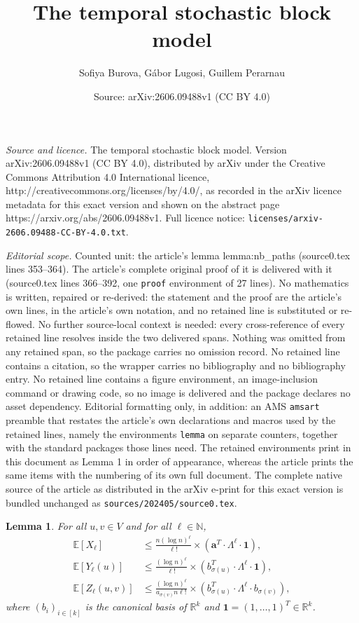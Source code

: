 \documentclass[10pt,a4paper]{amsart}
\title{The temporal stochastic block model}
\author{Sofiya Burova, G\'abor Lugosi, Guillem Perarnau}
\date{Source: arXiv:2606.09488v1 (CC BY 4.0)}
\newtheorem{lemma}{Lemma}
\newcommand\bE{{\mathbb E}}
\newcommand\bN{{\mathbb N}}
\begin{document}
\maketitle

\noindent\emph{Source and licence.} The temporal stochastic block model. Version arXiv:2606.09488v1 (CC BY 4.0), distributed by arXiv under the Creative Commons Attribution 4.0 International licence, http://creativecommons.org/licenses/by/4.0/, as recorded in the arXiv licence metadata for this exact version and shown on the abstract page https://arxiv.org/abs/2606.09488v1. Full licence notice: \texttt{licenses/arxiv-2606.09488-CC-BY-4.0.txt}.\par\smallskip

\noindent\textit{Editorial scope.} Counted unit: the article's lemma lemma:nb\_paths (source0.tex lines 353--364). The article's complete original proof of it is delivered with it (source0.tex lines 366--392, one \texttt{proof} environment of 27 lines). No mathematics is written, repaired or re-derived: the statement and the proof are the article's own lines, in the article's own notation, and no retained line is substituted or re-flowed.  No further source-local context is needed: every cross-reference of every retained line resolves inside the two delivered spans.  Nothing was omitted from any retained span, so the package carries no omission record.  No retained line contains a citation, so the wrapper carries no bibliography and no bibliography entry.  No retained line contains a figure environment, an image-inclusion command or drawing code, so no image is delivered and the package declares no asset dependency.  Editorial formatting only, in addition: an AMS \texttt{amsart} preamble that restates the article's own declarations and macros used by the retained lines, namely the environments \texttt{lemma} on separate counters, together with the standard packages those lines need.  The retained environments print in this document as Lemma 1 in order of appearance, whereas the article prints the same items with the numbering of its own full document.  The complete native source of the article as distributed in the arXiv e-print for this exact version is bundled unchanged as \texttt{sources/202405/source0.tex}.
\begin{lemma}
\label{lemma:nb_paths}
For all $u,v \in V$ and for all $\ell \in \bN$,
\begin{equation*}
\begin{split}
\bE[X_\ell] &\leq  \frac{n (\log n)^\ell }{\ell!} \times (\boldsymbol{a}^T \cdot \Lambda^\ell \cdot \boldsymbol{1}), \\
\bE[Y_\ell(u)] &\leq \frac{(\log n)^\ell }{\ell!} \times (b_{\sigma(u)}^T \cdot \Lambda^\ell \cdot \boldsymbol{1}),\\
\bE[Z_\ell(u,v)] &\leq \frac{(\log n)^\ell }{a_{\sigma(v)}n\ell!} \times (b_{\sigma(u)}^T \cdot \Lambda^\ell \cdot b_{\sigma(v)}),
\end{split}
\end{equation*}
where $(b_i)_{i \in [k]}$ is the canonical basis of $\mathbb{R}^k$ and $\boldsymbol{1} = (1,\ldots,1)^T \in \mathbb{R}^k$. 
\end{lemma}
\end{document}
